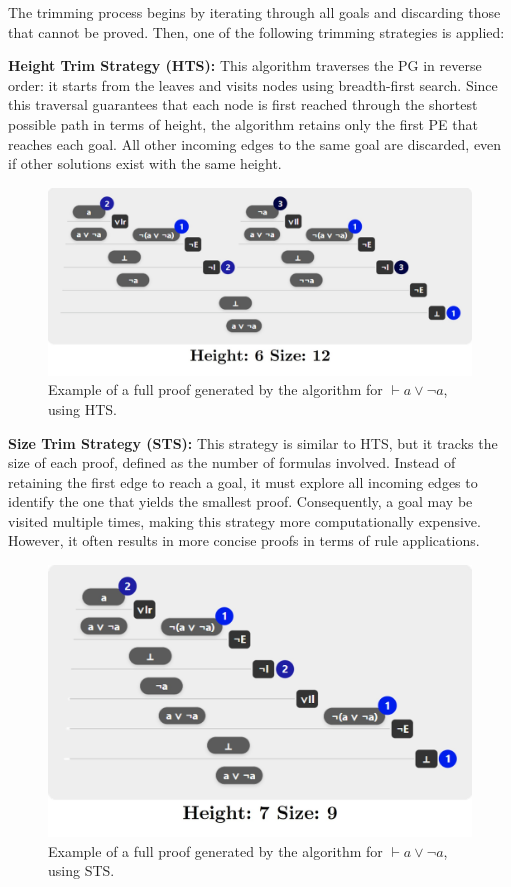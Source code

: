 The trimming process begins by iterating through all goals and discarding those that cannot be proved. Then, one of the following trimming strategies is applied:
\vspace{1em}

\textbf{Height Trim Strategy (HTS):} This algorithm traverses the PG in reverse order: it starts from the leaves and visits nodes using breadth-first search. Since this traversal guarantees that each node is first reached through the shortest possible path in terms of height, the algorithm retains only the first PE that reaches each goal. All other incoming edges to the same goal are discarded, even if other solutions exist with the same height.

\begin{figure}
    \centering
    \includegraphics[width=0.6\linewidth]{resources/trim-height.jpg}
    \caption{Example of a full proof generated by the algorithm for \(\vdash a \vee \lnot a\), using HTS.}
    \label{fig:sg-trim-height}
\end{figure}

\textbf{Size Trim Strategy (STS):} This strategy is similar to HTS, but it tracks the size of each proof, defined as the number of formulas involved. Instead of retaining the first edge to reach a goal, it must explore all incoming edges to identify the one that yields the smallest proof. Consequently, a goal may be visited multiple times, making this strategy more computationally expensive. However, it often results in more concise proofs in terms of rule applications.

\begin{figure}
    \centering
    \includegraphics[width=0.6\linewidth]{resources/trim-size.jpg}
    \caption{Example of a full proof generated by the algorithm for \(\vdash a \vee \lnot a\), using STS.}
    \label{fig:sg-trim-size}
\end{figure}

